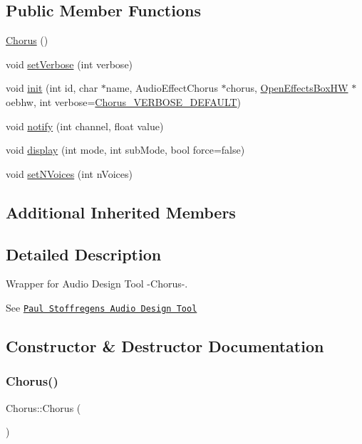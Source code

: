 \subsection*{Public Member Functions}
\begin{DoxyCompactItemize}
\item 
\mbox{\hyperlink{class_chorus_a125a7aa1daf841c2da11450b0c79b51b}{Chorus}} ()
\item 
void \mbox{\hyperlink{class_chorus_a26bc317aad64c5da7b643e57178b3e89}{set\+Verbose}} (int verbose)
\item 
void \mbox{\hyperlink{class_chorus_a234b46541693909b60a21cf644bd5926}{init}} (int id, char $\ast$name, Audio\+Effect\+Chorus $\ast$chorus, \mbox{\hyperlink{class_open_effects_box_h_w}{Open\+Effects\+Box\+HW}} $\ast$oebhw, int verbose=\mbox{\hyperlink{_chorus_8h_ab3779d2226e8ab06fa78da0c6161597a}{Chorus\+\_\+\+V\+E\+R\+B\+O\+S\+E\+\_\+\+D\+E\+F\+A\+U\+LT}})
\item 
void \mbox{\hyperlink{class_chorus_acb22e9cc93011859d1ae02b05a7388f5}{notify}} (int channel, float value)
\item 
void \mbox{\hyperlink{class_chorus_a6a28900025c58af59c7eb70f49347422}{display}} (int mode, int sub\+Mode, bool force=false)
\item 
void \mbox{\hyperlink{class_chorus_adfe582e095779c9a658a9633bad8251b}{set\+N\+Voices}} (int n\+Voices)
\end{DoxyCompactItemize}
\subsection*{Additional Inherited Members}


\subsection{Detailed Description}
Wrapper for Audio Design Tool -\/\+Chorus-\/. 

See \href{https://www.pjrc.com/teensy/gui/}{\tt Paul Stoffregen\textquotesingle{}s Audio Design Tool} 

\subsection{Constructor \& Destructor Documentation}
\mbox{\label{class_chorus_a125a7aa1daf841c2da11450b0c79b51b}} 
\subsubsection{\texorpdfstring{Chorus()}{Chorus()}}
{\footnotesize\ttfamily Chorus\+::\+Chorus (\begin{DoxyParamCaption}{ }\end{DoxyParamCaption})}




